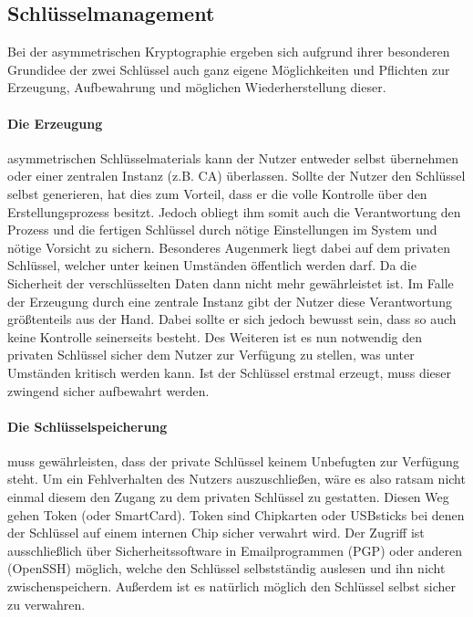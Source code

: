 \documentclass[paper=a4,11pt,german]{scrartcl} %
\begin{document}
\subsection{Schlüsselmanagement}
Bei der asymmetrischen Kryptographie ergeben sich aufgrund ihrer besonderen Grundidee der zwei Schlüssel auch ganz eigene Möglichkeiten und Pflichten zur Erzeugung, Aufbewahrung und möglichen Wiederherstellung dieser. 

\paragraph{Die Erzeugung}
asymmetrischen Schlüsselmaterials kann der Nutzer entweder selbst übernehmen oder einer zentralen Instanz (z.B. CA) überlassen.
Sollte der Nutzer den Schlüssel selbst generieren, hat dies zum Vorteil, dass er die volle Kontrolle über den Erstellungsprozess besitzt. Jedoch obliegt ihm somit auch die Verantwortung den Prozess und die fertigen Schlüssel durch nötige Einstellungen im System und nötige Vorsicht zu sichern. Besonderes Augenmerk liegt dabei auf dem privaten Schlüssel, welcher unter keinen Umständen öffentlich werden darf. Da die Sicherheit der verschlüsselten Daten dann nicht mehr gewährleistet ist. 
Im Falle der Erzeugung durch eine zentrale Instanz gibt der Nutzer diese Verantwortung größtenteils aus der Hand. Dabei sollte er sich jedoch bewusst sein, dass so auch keine Kontrolle seinerseits besteht. Des Weiteren ist es nun notwendig den privaten Schlüssel sicher dem Nutzer zur Verfügung zu stellen, was unter Umständen kritisch werden kann. Ist der Schlüssel erstmal erzeugt, muss dieser zwingend sicher aufbewahrt werden.

\paragraph{Die Schlüsselspeicherung}
muss gewährleisten, dass der private Schlüssel keinem Unbefugten zur Verfügung steht. Um ein Fehlverhalten des Nutzers auszuschließen, wäre es also ratsam nicht einmal diesem den Zugang zu dem privaten Schlüssel zu gestatten. Diesen Weg gehen Token (oder SmartCard). Token sind Chipkarten oder USBsticks bei denen der Schlüssel auf einem internen Chip sicher verwahrt wird. Der Zugriff ist ausschließlich über Sicherheitssoftware in Emailprogrammen (PGP) oder anderen (OpenSSH) möglich, welche den Schlüssel selbstständig auslesen und ihn nicht zwischenspeichern. Außerdem ist es natürlich möglich den Schlüssel selbst sicher zu verwahren.
\end{document}
